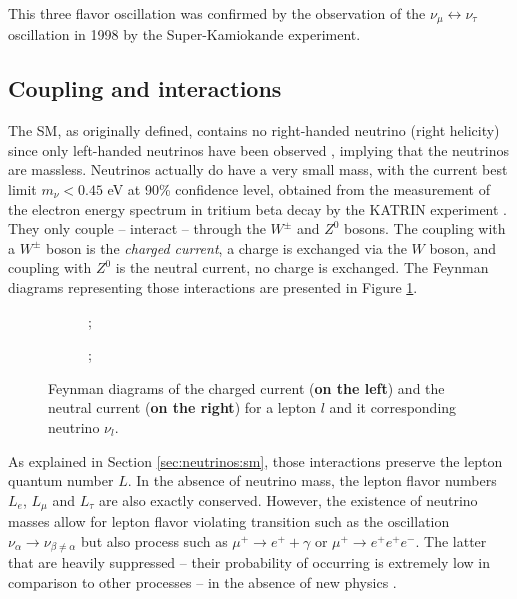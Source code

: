 \documentclass[../main.tex]{subfiles}
\begin{document}
This three flavor oscillation was confirmed by the observation of the $\nu_\mu \leftrightarrow \nu_\tau$ oscillation \cite{fukuda_evidence_1998} in 1998 by the Super-Kamiokande experiment.

\subsection{Coupling and interactions}

The SM, as originally defined, contains no right-handed neutrino (right helicity) since only left-handed neutrinos have been observed \cite{goldhaber_helicity_1958}, implying that the neutrinos are massless. Neutrinos actually do have a very small mass, with the current best limit $m_\nu < 0.45$ eV at 90\% confidence level, obtained from the measurement of the electron energy spectrum in tritium beta decay by the KATRIN experiment \cite{aker_direct_2024}. They only couple -- interact -- through the $W^{\pm}$ and $Z^0$ bosons. The coupling with a $W^{\pm}$ boson is the \textit{charged current}, a charge is exchanged via the $W$ boson, and coupling with $Z^0$ is the neutral current, no charge is exchanged. The Feynman diagrams representing those interactions are presented in Figure \ref{fig:neutrinos:currents}.

\begin{figure}
  \centering
  \begin{subfigure}[t]{0.48\linewidth}
    \centering
    ;
  \end{subfigure}
  \hfill
  \begin{subfigure}[t]{0.48\linewidth}
    \centering
    ;
  \end{subfigure}
  \caption{Feynman diagrams of the charged current (\textbf{on the left}) and the neutral current (\textbf{on the right}) for a lepton $l$ and it corresponding neutrino $\nu_l$.}
  \label{fig:neutrinos:currents}
\end{figure}

As explained in Section \ref{sec:neutrinos:sm}, those interactions preserve the lepton quantum number $L$. In the absence of neutrino mass, the lepton flavor numbers $L_e$, $L_\mu$ and $L_\tau$ are also exactly conserved. However, the existence of neutrino masses allow for lepton flavor violating transition such as the oscillation $\nu_\alpha \rightarrow \nu_{\beta \neq \alpha}$ but also process such as $\mu^+ \rightarrow e^+ + \gamma$ or $\mu^+ \rightarrow e^+ e^+ e^-$. The latter that are heavily suppressed -- their probability of occurring is extremely low in comparison to other processes -- in the absence of new physics \cite{glashow_weak_1970}.
\end{document}
